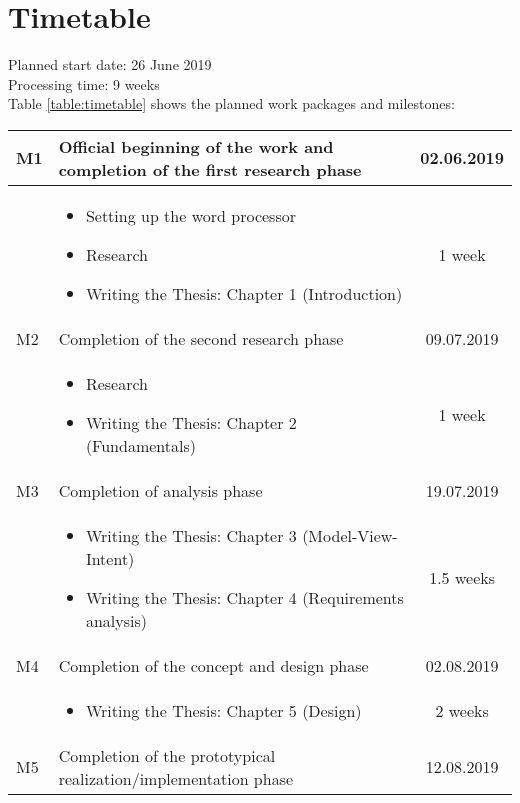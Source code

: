 \section{Timetable}
\label{sec:timetable}
\renewcommand{\arraystretch}{1.5}

Planned start date: 26 June 2019
\\
Processing time: 9 weeks
\\
Table \ref{table:timetable} shows the planned work packages and milestones:

\begin{flushleft}
	\begin{longtable}{ | l | p{11cm} | c |}
		\hline
		M1 & Official beginning of the work and completion of the first research phase & 02.06.2019 \\ 
		\hline
		& \begin{itemize}
			\item Setting up the word processor
			\item Research
			\item Writing the Thesis: Chapter 1 (Introduction)
			\end{itemize} & 1 week \\
		\hline
		M2 & Completion of the second research phase & 09.07.2019 \\ 
		\hline
		& \begin{itemize}
			\item Research
			\item Writing the Thesis: Chapter 2 (Fundamentals)
			\end{itemize} & 1 week \\
		\hline
		M3 & Completion of analysis phase & 19.07.2019 \\ 
		\hline
		& \begin{itemize}
			\item Writing the Thesis: Chapter 3 (Model-View-Intent)
			\item Writing the Thesis: Chapter 4 (Requirements analysis)
		\end{itemize} & 1.5 weeks \\
		\hline
		M4 & Completion of the concept and design phase & 02.08.2019 \\ 
		\hline
		& \begin{itemize}
			\item Writing the Thesis: Chapter 5 (Design)
		\end{itemize} & 2 weeks \\
		\hline
		M5 & Completion of the prototypical realization/implementation phase & 12.08.2019 \\ 

\end{longtable}
\end{flushleft}
